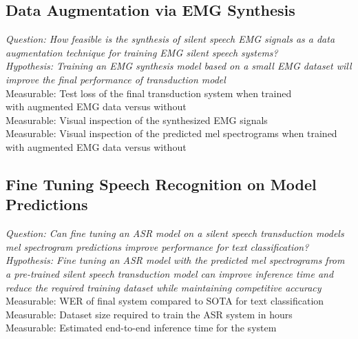 \subsection{Data Augmentation via EMG Synthesis}
\textit{Question: How feasible is the synthesis of silent speech EMG signals
as a data augmentation technique for training EMG silent speech systems?} \\
\textit{Hypothesis: Training an EMG synthesis model based on a small
EMG dataset will improve the final performance of transduction model} \\
Measurable: Test loss of the final transduction system when trained\\
with augmented EMG data versus without\\
Measurable: Visual inspection of the synthesized EMG signals\\
Measurable: Visual inspection of the predicted mel spectrograms when
trained with augmented EMG data versus without\\

\subsection{Fine Tuning Speech Recognition on Model Predictions }
\textit{Question: Can fine tuning an ASR model on a silent speech
transduction models mel spectrogram predictions improve performance for
text classification?} \\
\textit{Hypothesis: Fine tuning an ASR model with the predicted
mel spectrograms from a pre-trained silent speech transduction model
can improve inference time and reduce the required training dataset
while maintaining competitive accuracy} \\
Measurable: WER of final system compared to SOTA for text classification \\
Measurable: Dataset size required to train the ASR system in hours \\
Measurable: Estimated end-to-end inference time for the system